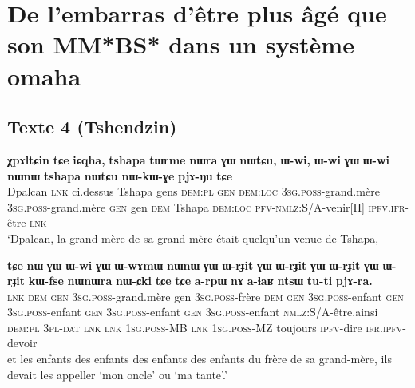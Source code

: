 \documentclass[oneside,a4paper,11pt]{article}
\newcommand{\ipa}[1]{{\phon\textbf{#1}}}
\begin{document}
\section{De l'embarras d'être plus âgé que son MM*BS* dans un système omaha}

\subsection{Texte 4 (Tshendzin)}

\begin{exe}
\ex 
\gll 
\ipa{χpɤltɕin} 	\ipa{tɕe} 	\ipa{iɕqha,} 	\ipa{tshapa} 	\ipa{tɯrme} 	\ipa{nɯra} 	\ipa{ɣɯ} 	\ipa{nɯtɕu,} \ipa{ɯ-wi,} 	\ipa{ɯ-wi} 	\ipa{ɣɯ} 	\ipa{ɯ-wi} 	\ipa{nɯnɯ} 	\ipa{tshapa} 	\ipa{nɯtɕu} 	\ipa{nɯ-kɯ-ɣe} 	\ipa{pjɤ-ŋu} 	\ipa{tɕe}  \\
Dpalcan \textsc{lnk} ci.dessus Tshapa gens  \textsc{dem:pl} \textsc{gen}  \textsc{dem:loc} \textsc{3sg.poss}-grand.mère  \textsc{3sg.poss}-grand.mère  \textsc{gen} gen \textsc{dem} Tshapa \textsc{dem:loc} \textsc{pfv}-\textsc{nmlz}:S/A-venir[II] \textsc{ipfv.ifr}-être \textsc{lnk}  \\
\glt `Dpalcan, la grand-mère de sa grand mère était quelqu'un venue de Tshapa, 
\end{exe}
\begin{exe}
\ex 
\gll 
\ipa{tɕe} 	\ipa{nɯ} 	\ipa{ɣɯ} 	\ipa{ɯ-wi} 	\ipa{ɣɯ} 	\ipa{ɯ-wɤmɯ} 	\ipa{nɯnɯ} 	\ipa{ɣɯ} 	\ipa{ɯ-rɟit} 	\ipa{ɣɯ} 	\ipa{ɯ-rɟit} 	\ipa{ɣɯ} 	\ipa{ɯ-rɟit} 	\ipa{ɣɯ} 	\ipa{ɯ-rɟit} 	\ipa{kɯ-fse} 	\ipa{nɯnɯra} 	\ipa{nɯ-ɕki} 	\ipa{tɕe} 	\ipa{tɕe} 	\ipa{a-rpɯ} \ipa{nɤ} \ipa{a-ɬaʁ} 	\ipa{ntsɯ} 	\ipa{tu-ti} 	\ipa{pjɤ-ra.} \\
\textsc{lnk} \textsc{dem} \textsc{gen} \textsc{3sg.poss}-grand.mère gen \textsc{3sg.poss}-frère \textsc{dem} \textsc{gen} \textsc{3sg.poss}-enfant \textsc{gen} \textsc{3sg.poss}-enfant \textsc{gen} \textsc{3sg.poss}-enfant \textsc{gen} \textsc{3sg.poss}-enfant \textsc{nmlz}:S/A-être.ainsi \textsc{dem:pl} \textsc{3pl-dat} \textsc{lnk}  \textsc{lnk} \textsc{1sg.poss}-MB \textsc{lnk} \textsc{1sg.poss}-MZ toujours \textsc{ipfv}-dire \textsc{ifr.ipfv}-devoir \\
\glt et les enfants des enfants des enfants des enfants du frère de sa grand-mère, ils devait les appeller `mon oncle' ou `ma tante'.'
\end{exe}
\end{document}
